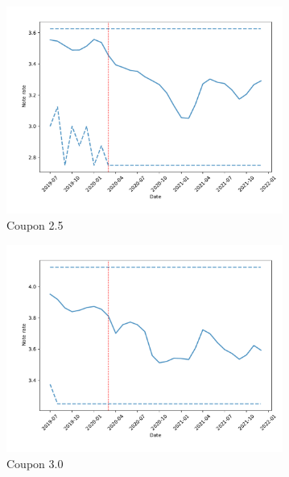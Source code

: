 \documentclass[11pt,a4paper]{article}
\begin{document}
\begin{figure}[h]
  \centering
  \begin{subfigure}[b]{0.49\textwidth}
      \includegraphics[width=0.998\textwidth]{../results/figures/NoteRate_mean_mat30_loan1_timeseries_nrmonthly_2.5_4_c25.0.pdf}
      \caption{ Coupon 2.5}
     \end{subfigure}
      \begin{subfigure}[b]{0.49\textwidth}
        \includegraphics[width=0.998\textwidth]{../results/figures/NoteRate_mean_mat30_loan1_timeseries_nrmonthly_2.5_4_c30.0.pdf}
        \caption{ Coupon 3.0}
        \end{subfigure}
        \begin{subfigure}[b]{0.49\textwidth}

\end{subfigure}
\end{figure}
\end{document}

